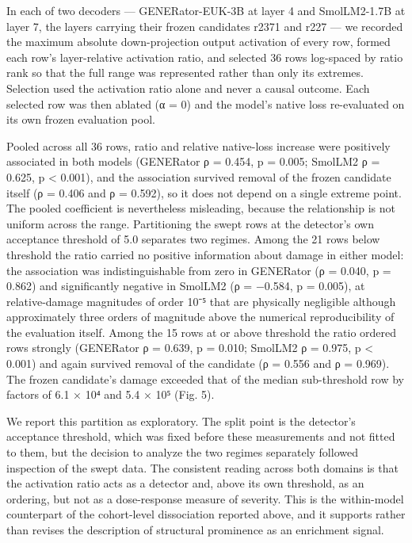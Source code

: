 \documentclass[11pt]{article}
\begin{document}
In each of two decoders — GENERator-EUK-3B at layer 4 and SmolLM2-1.7B at layer 7, the layers carrying their frozen candidates r2371 and r227 — we recorded the maximum absolute down-projection output activation of every row, formed each row’s layer-relative activation ratio, and selected 36 rows log-spaced by ratio rank so that the full range was represented rather than only its extremes. Selection used the activation ratio alone and never a causal outcome. Each selected row was then ablated (α = 0) and the model’s native loss re-evaluated on its own frozen evaluation pool.

Pooled across all 36 rows, ratio and relative native-loss increase were positively associated in both models (GENERator ρ = 0.454, p = 0.005; SmolLM2 ρ = 0.625, p < 0.001), and the association survived removal of the frozen candidate itself (ρ = 0.406 and ρ = 0.592), so it does not depend on a single extreme point. The pooled coefficient is nevertheless misleading, because the relationship is not uniform across the range. Partitioning the swept rows at the detector’s own acceptance threshold of 5.0 separates two regimes. Among the 21 rows below threshold the ratio carried no positive information about damage in either model: the association was indistinguishable from zero in GENERator (ρ = 0.040, p = 0.862) and significantly negative in SmolLM2 (ρ = −0.584, p = 0.005), at relative-damage magnitudes of order 10⁻⁵ that are physically negligible although approximately three orders of magnitude above the numerical reproducibility of the evaluation itself. Among the 15 rows at or above threshold the ratio ordered rows strongly (GENERator ρ = 0.639, p = 0.010; SmolLM2 ρ = 0.975, p < 0.001) and again survived removal of the candidate (ρ = 0.556 and ρ = 0.969). The frozen candidate’s damage exceeded that of the median sub-threshold row by factors of 6.1 × 10⁴ and 5.4 × 10⁵ (Fig. 5).

We report this partition as exploratory. The split point is the detector’s acceptance threshold, which was fixed before these measurements and not fitted to them, but the decision to analyze the two regimes separately followed inspection of the swept data. The consistent reading across both domains is that the activation ratio acts as a detector and, above its own threshold, as an ordering, but not as a dose-response measure of severity. This is the within-model counterpart of the cohort-level dissociation reported above, and it supports rather than revises the description of structural prominence as an enrichment signal.
\end{document}
